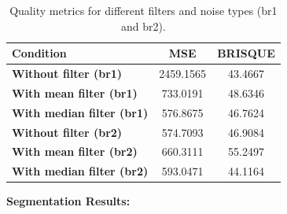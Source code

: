 \documentclass[11pt,letterpaper,twocolumn]{article}
\begin{document}
\begin{table}[ht]
\centering
\small %
\begin{tabular}{@{} l c c @{}} 
\toprule
\textbf{Condition} & \textbf{MSE} & \textbf{BRISQUE} \\ \midrule
\textbf{Without filter (br1)} & 2459.1565 & 43.4667 \\
\textbf{With mean filter (br1)} & 733.0191 & 48.6346 \\
\textbf{With median filter (br1)} & 576.8675 & 46.7624 \\ \midrule
\textbf{Without filter (br2)} & 574.7093 & 46.9084 \\
\textbf{With mean filter (br2)} & 660.3111 & 55.2497 \\
\textbf{With median filter (br2)} & 593.0471 & 44.1164 \\ \bottomrule
\end{tabular}
\caption{Quality metrics for different filters and noise types (br1 and br2).}
\label{tab:quality_metrics}
\end{table}
\textbf{Segmentation Results:} 
\end{document}
